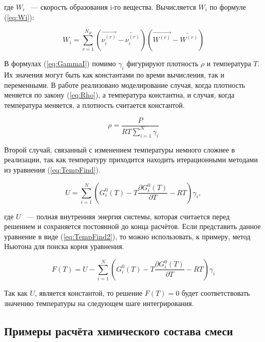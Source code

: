 где $W_i$ ~--- скорость образования i-го вещества. Вычисляется $W_i$ по формуле (\ref{eq:Wi}):

\begin{equation}
    W_i = \sum\limits_{r = 1}^{N_R}(\overrightarrow{\nu_i^{(r)}} - \overleftarrow{\nu_i^{(r)}})(\overrightarrow{W^{(r)}} - \overleftarrow{W^{(r)}})
    \label{eq:Wi}
\end{equation}

В формулах (\ref{eq:GammaI}) помимо $\gamma_i$ фигурируют плотность $\rho$ и температура $T$. Их значения могут быть как константами по
времи вычисления, так и переменными. В работе реализовано моделирование случая, когда плотность меняется по закону 
(\ref{eq:Rho}), а температура константна, и случая, когда температура меняется, а плотность считается константой.

\begin{equation}
    \rho = \dfrac{P}{RT\sum\limits_{i = 1}^{N}\gamma_i}
    \label{eq:Rho}
\end{equation}

Второй случай, связанный с изменением температуры немного сложнее в реализации, так как температуру приходится находить итерационными
методами из уравнения (\ref{eq:TempFind}).

\begin{equation}
    U = \sum\limits_{i = 1}^{N}(G_i^0(T) - T\dfrac{\partial G_i^0(T)}{\partial T} - RT)\gamma_i,
    \label{eq:TempFind}
\end{equation}

где $U$ ~--- полная внутренняя энергия системы, которая считается перед решением и сохраняется постоянной до конца расчётов. Если
представить данное уравнение в виде (\ref{eq:TempFind2}), то можно использовать, к примеру, метод Ньютона для поиска корня уравнения.

\begin{equation}
    F(T) = U - \sum\limits_{i = 1}^{N}(G_i^0(T) - T\dfrac{\partial G_i^0(T)}{\partial T} - RT)\gamma_i
    \label{eq:TempFind2}
\end{equation}

Так как $U$, является константой, то решение $F(T) = 0$ будет соответствовать значению температуры на следующем шаге интегрирования. 

\subsection{Примеры расчёта химического состава смеси}

